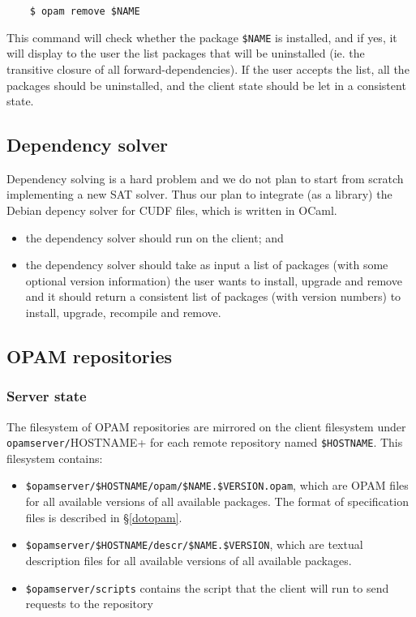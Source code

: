 \documentclass[a4paper,11pt]{article}
\begin{document}
\begin{verbatim}
    $ opam remove $NAME
\end{verbatim}

This command will check whether the package \verb+$NAME+ is installed,
and if yes, it will display to the user the list packages that will be
uninstalled (ie. the transitive closure of all forward-dependencies).
If the user accepts the list, all the packages should be uninstalled,
and the client state should be let in a consistent state.

\subsection{Dependency solver}
\label{deps}

Dependency solving is a hard problem and we do not plan to start from
scratch implementing a new SAT solver. Thus our plan to integrate (as
a library) the Debian depency solver for CUDF files, which is written
in OCaml.

\begin{itemize}
\item the dependency solver should run on the client; and
\item the dependency solver should take as input a list of packages
  (with some optional version information) the user wants to install,
  upgrade and remove and it should return a consistent list of
  packages (with version numbers) to install, upgrade, recompile and
  remove.
\end{itemize}

\subsection{OPAM repositories}
\label{repository}

\subsubsection{Server state}

The filesystem of OPAM repositories are mirrored on the client
filesystem under \verb$opamserver/$HOSTNAME+ for each remote
repository named \verb+$HOSTNAME+. This filesystem contains:

\begin{itemize}

\item \verb+$opamserver/$HOSTNAME/opam/$NAME.$VERSION.opam+, which are
  OPAM files for all available versions of all available packages. The
  format of specification files is described in \S\ref{dotopam}.

\item \verb+$opamserver/$HOSTNAME/descr/$NAME.$VERSION+, which are
  textual description files for all available versions of all
  available packages.

\item \verb+$opamserver/scripts+ contains the script that the client
  will run to send requests to the repository

\end{itemize}
\end{document}
